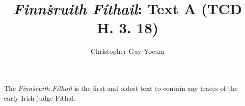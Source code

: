\documentclass[11pm]{article}
\author{Christopher Guy Yocum}
\title{\emph{Finn\.{s}ruith F\'{i}thail}: Text A (TCD H. 3. 18)}
\begin{document}
\maketitle

The \emph{Finn\.{s}ruith F\'{i}thail} is the first and oldest text to contain any traces of the early Irish judge F\'{i}thal.  
\end{document}
